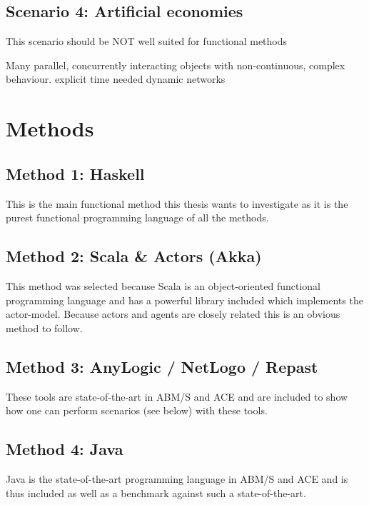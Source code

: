 \documentclass{article}
\begin{document}
\subsection{Scenario 4: Artificial economies}
This scenario should be NOT well suited for functional methods

Many parallel, concurrently interacting objects with non-continuous, complex behaviour.
explicit time needed
dynamic networks



\section{Methods}
\subsection{Method 1: Haskell}
This is the main functional method this thesis wants to investigate as it is the purest functional programming language of all the methods.

\subsection{Method 2: Scala \& Actors (Akka)}
This method was selected because Scala is an object-oriented functional programming language and has a powerful library included which implements the actor-model. Because actors and agents are closely related this is an obvious method to follow.

\subsection{Method 3: AnyLogic / NetLogo / Repast}
These tools are state-of-the-art in ABM/S and ACE and are included to show how one can perform scenarios (see below) with these tools.

\subsection{Method 4: Java}
Java is the state-of-the-art programming language in ABM/S and ACE and is thus included as well as a benchmark against such a state-of-the-art.

\end{document}

